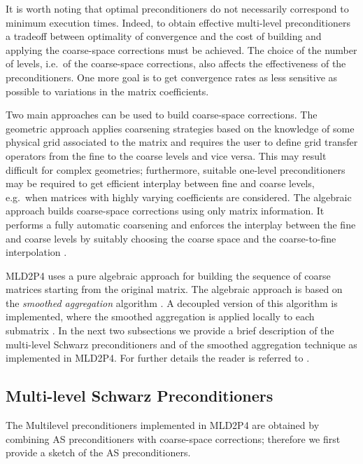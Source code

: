It is worth noting that optimal preconditioners do not necessarily correspond
to minimum execution times. Indeed, to obtain effective multi-level preconditioners
a tradeoff between optimality of convergence and the cost of building and applying
the coarse-space corrections must be achieved. The choice of the number of levels,
i.e.\ of the coarse-space corrections, also affects the effectiveness of the
preconditioners. One more goal is to get convergence rates as less sensitive
as possible to variations in the matrix coefficients.

Two main approaches can be used to build coarse-space corrections. The geometric approach
applies coarsening strategies based on the knowledge of some physical grid associated
to the matrix and requires the user to define grid transfer operators from the fine
to the coarse levels and vice versa. This may result difficult for complex geometries;
furthermore, suitable one-level preconditioners may be required to get efficient
interplay between fine and coarse levels, e.g.\ when matrices with highly varying coefficients
are considered. The algebraic approach builds coarse-space corrections using only matrix
information. It performs a fully automatic coarsening and enforces the interplay between
the fine and coarse levels by suitably choosing the coarse space and the coarse-to-fine
interpolation \cite{Stuben_01}.

MLD2P4 uses a pure algebraic approach for building the sequence of coarse matrices
starting from the original matrix. The algebraic approach is based on the \emph{smoothed 
aggregation} algorithm \cite{BREZINA_VANEK,VANEK_MANDEL_BREZINA}. A decoupled version
of this algorithm is implemented, where the smoothed aggregation is applied locally
to each submatrix \cite{TUMINARO_TONG}. In the next two subsections we provide
a brief description of the multi-level Schwarz preconditioners and of the smoothed
aggregation technique as implemented in MLD2P4. For further details the reader
is referred to \cite{para_04,aaecc_07,apnum_07,MLD2P4_TOMS,dd2_96}.


\subsection{Multi-level Schwarz Preconditioners\label{sec:multilevel}}

The Multilevel preconditioners implemented in MLD2P4 are obtained by combining
AS preconditioners with coarse-space corrections; therefore
we first provide a sketch of the AS preconditioners.

